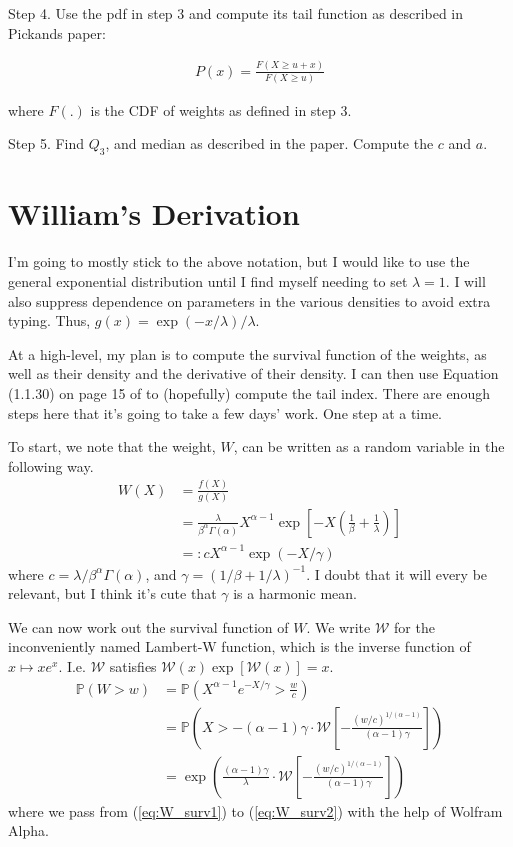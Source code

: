 \documentclass{article}
\newcommand{\bP}{\mathbb{P}}
\newcommand{\sW}{\mathscr{W}}
\begin{document}
Step 4. Use the pdf in step 3 and compute its tail function as described in Pickands paper:

\begin{align}
    P(x) = \frac{F(X \geq u+x)}{F(X \geq u)}
\end{align}

where $F(.)$ is the CDF of weights as defined in step 3.

Step 5. Find $Q_3$, and median as described in the paper. Compute the $c$ and $a$. 


\section{William's Derivation}

I'm going to mostly stick to the above notation, but I would like to use the general exponential distribution until I find myself needing to set $\lambda=1$. I will also suppress dependence on parameters in the various densities to avoid extra typing. Thus, $g(x) = \exp(-x/\lambda)/\lambda$.

At a high-level, my plan is to compute the survival function of the weights, as well as their density and the derivative of their density. I can then use Equation (1.1.30) on page 15 of \citet{deH06} to (hopefully) compute the tail index. There are enough steps here that it's going to take a few days' work. One step at a time.

To start, we note that the weight, $W$, can be written as a random variable in the following way.
%
\begin{align}
    W(X) &= \frac{f(X)}{g(X)}\\
    &= \frac{\lambda}{\beta^\alpha \Gamma(\alpha)} X^{\alpha - 1} \exp\left[ -X \left( \frac{1}{\beta} + \frac{1}{\lambda} \right) \right]\\
    &=: c X^{\alpha - 1} \exp(-X / \gamma)
\end{align}
%
where $c = \lambda / \beta^\alpha \Gamma(\alpha)$, and $\gamma = (1/\beta + 1/\lambda)^{-1}$. I doubt that it will every be relevant, but I think it's cute that $\gamma$ is a harmonic mean. 

We can now work out the survival function of $W$. We write $\sW$ for the inconveniently named Lambert-W function, which is the inverse function of $x \mapsto x e^x$. I.e. $\sW$ satisfies $\sW(x) \exp[\sW(x)] = x$.
%
\begin{align}
    \bP (W > w) &= \bP \left( X^{\alpha - 1} e^{-X/\gamma} > \frac{w}{c} \right) \label{eq:W_surv1}\\
    &= \bP \left( X > - (\alpha - 1) \gamma \cdot \sW \left[ - \frac{(w/c)^{1/(\alpha-1)}}{(\alpha - 1) \gamma} \right] \right) \label{eq:W_surv2}\\
    &= \exp \left( \frac{(\alpha - 1) \gamma}{\lambda} \cdot \sW \left[ - \frac{(w/c)^{1/(\alpha-1)}}{(\alpha - 1) \gamma} \right] \right) \label{eq:W_surv3}
\end{align}
%
where we pass from (\ref{eq:W_surv1}) to (\ref{eq:W_surv2}) with the help of Wolfram Alpha.
\end{document}
